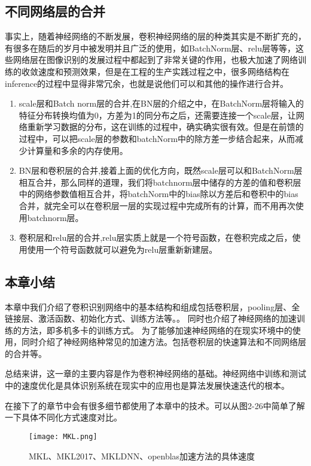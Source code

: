 \subsection{不同网络层的合并}
事实上，随着神经网络的不断发展，卷积神经网络的层的种类其实是不断扩充的，有很多在随后的岁月中被发明并且广泛的使用，如BatchNorm层、relu层等等，这些网络层在图像识别的发展过程中都起到了非常关键的作用，也极大加速了网络训练的收敛速度和预测效果，但是在工程的生产实践过程之中，很多网络结构在inference的过程中显得非常冗余，也就是说他们可以和其他的操作进行合并。
\begin{enumerate}
\item scale层和Batch norm层的合并,在BN层的介绍之中，在BatchNorm层将输入的特征分布转换均值为0，方差为1的同分布之后，还需要连接一个scale层，让网络重新学习数据的分布，这在训练的过程中，确实确实很有效。但是在前馈的过程中，可以把scale层的参数和batchNorm中的除方差一步结合起来，从而减少计算量和多余的内存使用。
\item BN层和卷积层的合并,接着上面的优化方向，既然scale层可以和BatchNorm层相互合并，那么同样的道理，我们将batchnorm层中储存的方差的值和卷积层中的网络参数值相互合并，将batchNorm中的bias除以方差后和卷积中的bias合并，就完全可以在卷积层一层的实现过程中完成所有的计算，而不用再次使用batchnorm层。
\item 卷积层和relu层的合并,relu层实质上就是一个符号函数，在卷积完成之后，使用使用一个符号函数就可以避免为relu层重新新建层。
\end{enumerate}

\subsection{本章小结}
本章中我们介绍了卷积识别网络中的基本结构和组成包括卷积层，pooling层、全链接层、激活函数、初始化方式、训练方法等。。
同时也介绍了神经网络的加速训练的方法，即多机多卡的训练方式。
为了能够加速神经网络的在现实环境中的使用，同时介绍了神经网络种常见的加速方法。包括卷积层的快速算法和不同网络层的合并等。

总结来讲，这一章的主要内容是作为卷积神经网络的基础。神经网络中训练和测试中的速度优化是具体识别系统在现实中的应用也是算法发展快速迭代的根本。

在接下了的章节中会有很多细节都使用了本章中的技术。可以从图2-26中简单了解一下具体不同化方式速度对比。
\begin{figure}[!h]
 \centering
	\texttt{[image: MKL.png]}
	\caption{MKL、MKL2017、MKLDNN、openblas加速方法的具体速度}
\end{figure}






